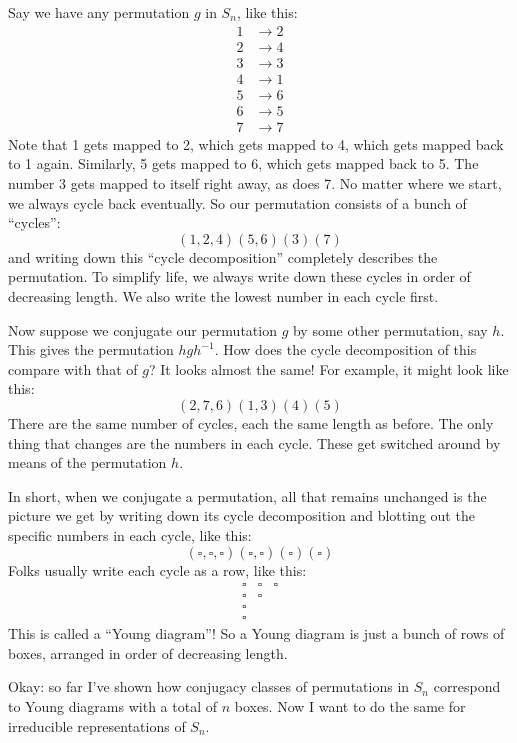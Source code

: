\documentclass{article}
\begin{document}
Say we have any permutation \(g\) in \(S_n\), like this: \[
  \begin{aligned}
    1 &\to 2
  \\2 &\to 4 
  \\3 &\to 3
  \\4 &\to 1
  \\5 &\to 6
  \\6 &\to 5
  \\7 &\to 7  
  \end{aligned}
\] Note that 1 gets mapped to 2, which gets mapped to 4, which gets
mapped back to 1 again. Similarly, 5 gets mapped to 6, which gets mapped
back to 5. The number 3 gets mapped to itself right away, as does 7. No
matter where we start, we always cycle back eventually. So our
permutation consists of a bunch of ``cycles'': \[(1,2,4) (5,6) (3) (7)\]
and writing down this ``cycle decomposition'' completely describes the
permutation. To simplify life, we always write down these cycles in
order of decreasing length. We also write the lowest number in each
cycle first.

Now suppose we conjugate our permutation \(g\) by some other
permutation, say \(h\). This gives the permutation \(hgh^{-1}\). How
does the cycle decomposition of this compare with that of \(g\)? It
looks almost the same! For example, it might look like this:
\[(2,7,6) (1,3) (4) (5)\] There are the same number of cycles, each the
same length as before. The only thing that changes are the numbers in
each cycle. These get switched around by means of the permutation \(h\).

In short, when we conjugate a permutation, all that remains unchanged is
the picture we get by writing down its cycle decomposition and blotting
out the specific numbers in each cycle, like this:
\[(\square,\square,\square) (\square,\square) (\square) (\square)\]
Folks usually write each cycle as a row, like this: \[
  \begin{array}{lll}
    \square&\square&\square
  \\\square&\square&
  \\\square&&
  \\\square&&
  \end{array}
\] This is called a ``Young diagram''! So a Young diagram is just a
bunch of rows of boxes, arranged in order of decreasing length.

Okay: so far I've shown how conjugacy classes of permutations in \(S_n\)
correspond to Young diagrams with a total of \(n\) boxes. Now I want to
do the same for irreducible representations of \(S_n\).
\end{document}
